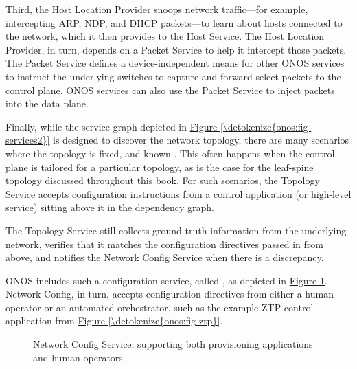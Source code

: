 \documentclass[letterpaper,11pt,english]{sphinxmanual}
\let\sphinxpxdimen\pdfpxdimen\else\newdimen\sphinxpxdimen
\begin{document}
Third, the Host Location Provider snoops network traffic—for example,
intercepting ARP, NDP, and DHCP packets—to learn about hosts connected
to the network, which it then provides to the Host Service. The Host
Location Provider, in turn, depends on a Packet Service to help it
intercept those packets. The Packet Service defines a
device-independent means for other ONOS services to instruct the
underlying switches to capture and forward select packets to the
control plane. ONOS services can also use the Packet Service to inject
packets into the data plane.

Finally, while the service graph depicted in \hyperref[\detokenize{onos:fig-services2}]{Figure \ref{\detokenize{onos:fig-services2}}} is designed to discover the network topology, there
are many scenarios where the topology is fixed, and known . This often happens when the control plane is tailored for a
particular topology, as is the case for the leaf-spine topology
discussed throughout this book. For such scenarios, the Topology
Service accepts configuration instructions from a control application
(or high-level service) sitting above it in the dependency graph.%
\begin{footnote}[2]\sphinxAtStartFootnote
The Topology Service still collects ground-truth information
from the underlying network, verifies that it matches the
configuration directives passed in from above, and notifies the
Network Config Service when there is a discrepancy.
%
\end{footnote}
ONOS includes such a configuration service, called ,
as depicted in \hyperref[\detokenize{onos:fig-services3}]{Figure \ref{\detokenize{onos:fig-services3}}}. Network Config, in
turn, accepts configuration directives from either a human operator or
an automated orchestrator, such as the example ZTP control application
from \hyperref[\detokenize{onos:fig-ztp}]{Figure \ref{\detokenize{onos:fig-ztp}}}.

\begin{figure}[htbp]
\centering
\capstart

\noindent\sphinxincludegraphics[width=300\sphinxpxdimen]{{Slide34}.png}
\caption{Network Config Service, supporting both provisioning applications
and human operators.}\label{\detokenize{onos:id10}}\label{\detokenize{onos:fig-services3}}\end{figure}
\end{document}
